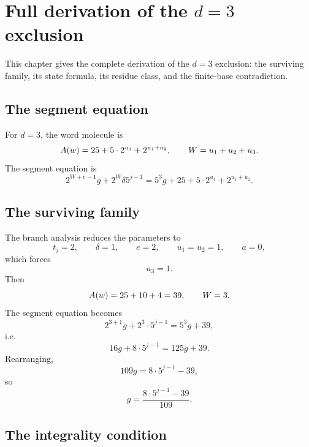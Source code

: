 \section{Full derivation of the $d=3$ exclusion}

This chapter gives the complete derivation of the $d=3$ exclusion:
the surviving family, its state formula, its residue class, and the
finite-base contradiction.

\subsection{The segment equation}

For $d=3$, the word molecule is
\begin{equation*}
  A(w)=25+5\cdot2^{u_1}+2^{u_1+u_2},
  \qquad
  W=u_1+u_2+u_3.
\end{equation*}
The segment equation is
\begin{equation*}
  2^{W+e-1}g+2^W\delta5^{j-1}
    =5^3g+25+5\cdot2^{u_1}+2^{u_1+u_2}.
\end{equation*}

\subsection{The surviving family}

The branch analysis reduces the parameters to
\begin{equation*}
  t_j=2,\qquad \delta=1,\qquad e=2,\qquad u_1=u_2=1,\qquad a=0,
\end{equation*}
which forces
\begin{equation*}
  u_3=1.
\end{equation*}
Then
\begin{equation*}
  A(w)=25+10+4=39,
  \qquad
  W=3.
\end{equation*}
The segment equation becomes
\begin{equation*}
  2^{3+1}g+2^3\cdot5^{j-1}=5^3g+39,
\end{equation*}
i.e.
\begin{equation*}
  16g+8\cdot5^{j-1}=125g+39.
\end{equation*}
Rearranging,
\begin{equation*}
  109g=8\cdot5^{j-1}-39,
\end{equation*}
so
\begin{equation*}
  g=\frac{8\cdot5^{j-1}-39}{109}.
\end{equation*}

\subsection{The integrality condition}

